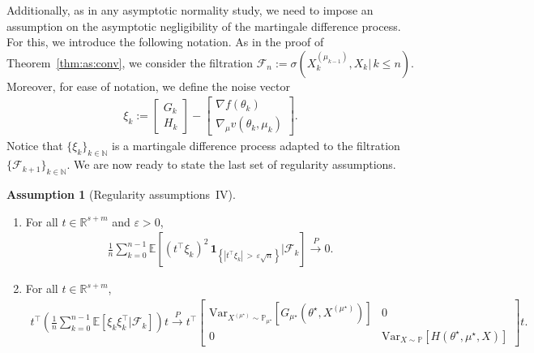 \documentclass[11pt,a4paper]{article}
\theoremstyle{definition}
\newtheorem{assumption}[theorem]{Assumption}
\begin{document}
Additionally, as in any asymptotic normality study, we need to impose an assumption on the asymptotic negligibility of the martingale difference process. For this, we introduce the following notation. As in the proof of Theorem~\ref{thm:as:conv}, we consider the filtration $\mathcal F_n := \sigma(X_k^{(\mu_{k-1})}, X_k |\, k \leq n)$. Moreover, for ease of notation, we define the noise vector
\begin{align}
\label{eq:def:xi_k}
    \xi_k := \begin{bmatrix}G_k \\ H_k \end{bmatrix} - \begin{bmatrix}\nabla{f}(\theta_k) \\ \nabla_\mu v(\theta_k,\mu_k)\end{bmatrix}.
\end{align}
Notice that $\{\xi_k\}_{k \in \mathbb N}$ is a martingale difference process adapted to the filtration $\{\mathcal F_{k+1}\}_{k \in \mathbb N}$. We are now ready to state the last set of regularity assumptions.

\begin{assumption}[Regularity assumptions~IV]~
\label{assump:asymp:norm:unif:int}
\begin{enumerate}[label=(\roman*)]
    \item \label{assump:asymp:norm:1:1} For all $t \in \mathbb R^{s+m}$ and $\varepsilon >0$,
    \begin{align*}
        \frac{1}{n}\sum_{k=0}^{n-1} \mathbb E \left[\left(t^\top \xi_k \right)^2 \,\mathbf{1}_{\left\{|t^\top \xi_k| \, > \, \varepsilon \sqrt{n}  \right\}} | \mathcal F_{k}\right] 
        \overset{P}{\to} 
        0.
    \end{align*}

    \item \label{assump:asymp:norm:1:2} For all $t \in \mathbb R^{s+m}$,
    \begin{align}
    \label{eq:assump:asymp:norm:1:2}
        t^\top \left(\frac{1}{n} \sum_{k=0}^{n-1}  \mathbb E \left[ 
        \xi_k \xi_k^\top | \mathcal F_k \right]\right) t 
        \overset{P}{\to} 
        t^\top \begin{bmatrix}
        \text{Var}_{X^{(\mu^\star)} \sim \mathbb P_{\mu^\star}}\left[ G_{\mu^\star}(\theta^\star,X^{(\mu^\star)})\right] & 0 \\ 0 & \text{Var}_{X \sim \mathbb P}\left[ H(\theta^\star, \mu^\star, X)\right]
    \end{bmatrix} t.
    \end{align}
\end{enumerate}
\end{assumption}
\end{document}

